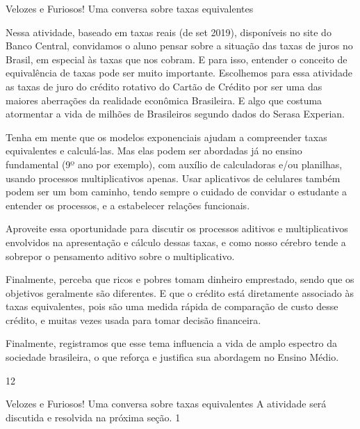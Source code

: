 \begin{sugestions}{Velozes e Furiosos! Uma conversa sobre taxas equivalentes}
{
Nessa atividade, baseado em taxas reais (de set 2019), disponíveis no site do Banco Central, convidamos o aluno pensar sobre a situação das taxas de juros no Brasil, em especial às taxas que nos cobram. E para isso, entender o conceito de equivalência de taxas pode ser muito importante. Escolhemos para essa atividade as taxas de juro do crédito rotativo do Cartão de Crédito por ser uma das maiores aberrações da realidade econômica Brasileira. E algo que costuma atormentar a vida de milhões de Brasileiros segundo dados do Serasa Experian. 

Tenha em mente que os modelos exponenciais ajudam a compreender taxas equivalentes e calculá-las. Mas elas podem ser abordadas já no ensino fundamental (9º ano por exemplo), com auxílio de calculadoras e/ou planilhas, usando processos multiplicativos apenas. Usar aplicativos de celulares também podem ser um bom caminho, tendo sempre o cuidado de convidar o estudante a entender os processos, e a estabelecer relações funcionais. 

Aproveite essa oportunidade para discutir os processos aditivos e multiplicativos envolvidos na apresentação e cálculo dessas taxas, e como nosso cérebro tende a sobrepor o pensamento aditivo sobre o multiplicativo. 

Finalmente, perceba que ricos e pobres tomam dinheiro emprestado, sendo que os objetivos geralmente são diferentes. E que o crédito está diretamente associado às taxas equivalentes, pois são uma medida rápida de comparação de custo desse crédito, e muitas vezes usada para tomar decisão financeira. 

Finalmente, registramos que esse tema influencia a vida de amplo espectro da sociedade brasileira, o que reforça e justifica sua abordagem no Ensino Médio. 

}{1}{2}
\end{sugestions}
\begin{answer}{Velozes e Furiosos! Uma conversa sobre taxas equivalentes}
{
A atividade será discutida e resolvida na próxima seção.
}{1}
\end{answer}

